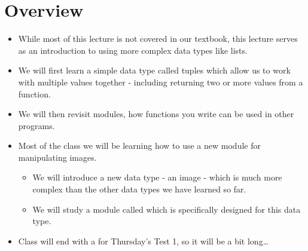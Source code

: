 \documentclass[letterpaper,10pt,english]{sphinxmanual}
\begin{document}
\section{Overview}
\label{\detokenize{lecture_notes/lec07_modules_images:overview}}\begin{itemize}
\item {} 
While most of this lecture is not covered in our textbook, this
lecture serves as an introduction to using more complex data types
like lists.

\item {} 
We will first learn a simple data type called tuples which allow
us to work with multiple values together - including returning two
or more values from a function.

\item {} 
We will then revisit modules, how functions you write can be used
in other programs.

\item {} 
Most of the class we will be learning how to use a new module for
manipulating images.
\begin{itemize}
\item {} 
We will introduce a new data type - an image - which is much more
complex than the other data types we have learned so far.

\item {} 
We will study a module called  which is specifically
designed for this data type.

\end{itemize}

\item {} 
Class will end with a  for Thursday’s Test 1, so it will be a
bit long…

\end{itemize}
\end{document}
